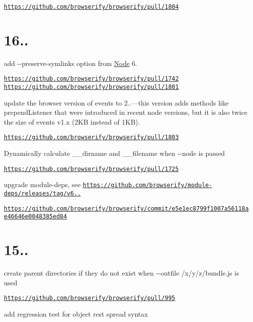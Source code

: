 \href{https://github.com/browserify/browserify/pull/1804}{\tt https\+://github.\+com/browserify/browserify/pull/1804}

\section*{16..}

add {\ttfamily -\/-\/preserve-\/symlinks} option from \mbox{\hyperlink{classNode}{Node}} 6.

\href{https://github.com/browserify/browserify/pull/1742}{\tt https\+://github.\+com/browserify/browserify/pull/1742} \href{https://github.com/browserify/browserify/pull/1801}{\tt https\+://github.\+com/browserify/browserify/pull/1801}

update the browser version of {\ttfamily events} to 2..—this version adds methods like {\ttfamily prepend\+Listener} that were introduced in recent node versions, but it is also twice the size of events v1.\+x (2\+KB instead of 1\+KB).

\href{https://github.com/browserify/browserify/pull/1803}{\tt https\+://github.\+com/browserify/browserify/pull/1803}

Dynamically calculate {\ttfamily \+\_\+\+\_\+dirname} and {\ttfamily \+\_\+\+\_\+filename} when {\ttfamily -\/-\/node} is passed

\href{https://github.com/browserify/browserify/pull/1725}{\tt https\+://github.\+com/browserify/browserify/pull/1725}

upgrade module-\/deps, see \href{https://github.com/browserify/module-deps/releases/tag/v6.0.0}{\tt https\+://github.\+com/browserify/module-\/deps/releases/tag/v6..}

\href{https://github.com/browserify/browserify/commit/e5e1ec8799f1007a56118ae46646e0048385ed84}{\tt https\+://github.\+com/browserify/browserify/commit/e5e1ec8799f1007a56118ae46646e0048385ed84}

\section*{15..}

create parent directories if they do not exist when {\ttfamily -\/-\/outfile /x/y/z/bundle.js} is used

\href{https://github.com/browserify/browserify/pull/995}{\tt https\+://github.\+com/browserify/browserify/pull/995}

add regression test for object rest spread syntax

